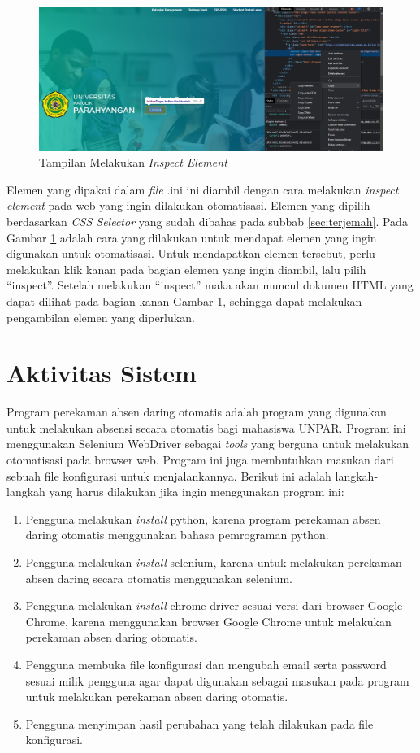\begin{figure}[H]
	\centering
	\includegraphics[scale=0.3]{Gambar/elemen.jpg}
	\caption{Tampilan Melakukan \textit{Inspect Element}} 
	\label{fig:inspect}
\end{figure}	
Elemen yang dipakai dalam \textit{file} .ini ini diambil dengan cara melakukan \textit{inspect element} pada web yang ingin dilakukan otomatisasi. Elemen yang dipilih berdasarkan \textit{CSS Selector} yang sudah dibahas pada subbab \ref{sec:terjemah}. Pada Gambar \ref{fig:inspect} adalah cara yang dilakukan untuk mendapat elemen yang ingin digunakan untuk otomatisasi. Untuk mendapatkan elemen tersebut, perlu melakukan klik kanan pada bagian elemen yang ingin diambil, lalu pilih ``inspect''. Setelah melakukan ``inspect'' maka akan muncul dokumen HTML yang dapat dilihat pada bagian kanan Gambar \ref{fig:inspect}, sehingga dapat melakukan pengambilan elemen yang diperlukan.

\section{Aktivitas Sistem}
\label{sec:diagramAktivitas}
Program perekaman absen daring otomatis adalah program yang digunakan untuk melakukan absensi secara otomatis bagi mahasiswa UNPAR. Program ini menggunakan Selenium WebDriver sebagai \textit{tools} yang berguna untuk melakukan otomatisasi pada browser web. Program ini juga membutuhkan masukan dari sebuah file konfigurasi untuk menjalankannya. Berikut ini adalah langkah-langkah yang harus dilakukan jika ingin menggunakan program ini:
\begin{enumerate}
	\item Pengguna melakukan \textit{install} python, karena program perekaman absen daring otomatis menggunakan bahasa pemrograman python.
	\item Pengguna melakukan \textit{install} selenium, karena untuk melakukan perekaman absen daring secara otomatis menggunakan selenium.
	\item Pengguna melakukan \textit{install} chrome driver sesuai versi dari browser Google Chrome, karena menggunakan browser Google Chrome untuk melakukan perekaman absen daring otomatis.
	\item Pengguna membuka file konfigurasi dan mengubah email serta password sesuai milik pengguna agar dapat digunakan sebagai masukan pada program untuk melakukan perekaman absen daring otomatis.
	\item Pengguna menyimpan hasil perubahan yang telah dilakukan pada file konfigurasi.
\end{enumerate}


